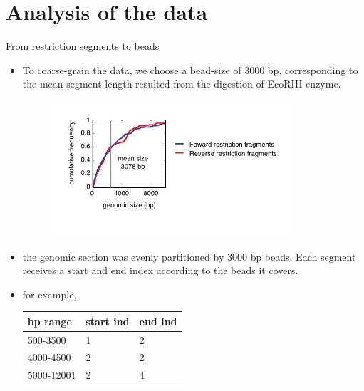 \documentclass[8pt]{beamer}
\begin{document}
\section{Analysis of the data}\label{section_analysisOfTheData}
\begin{frame}{From restriction segments to beads}
\begin{itemize}
\item To coarse-grain the data, we choose a bead-size of 3000 bp, corresponding to the mean segment length resulted from the digestion of EcoRIII enzyme. 

\begin{figure}[H]
\includegraphics[scale=0.55]{restrictionSegmentLengthDistributionLucaetal}
\end{figure}
\item the genomic section was evenly partitioned by 3000 bp beads. Each segment receives a start and end index according to the beads it covers. 
\item for example, 
\begin{tabular}[H]{|l| l| l|}
\hline
bp range & start ind & end ind\\
\hline
500-3500   & 1         & 2 \\
4000-4500  & 2         & 2 \\   
5000-12001 & 2         & 4 \\       
\hline  
\end{tabular}
\end{itemize}
\end{frame}
\end{document}
